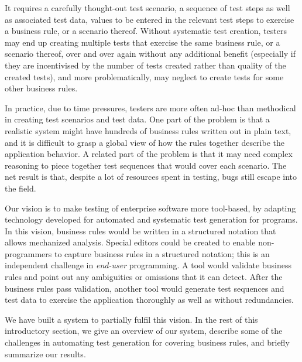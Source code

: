 
It requires a carefully thought-out test scenario, \ie a sequence of test steps
as well as associated test data, \ie values to be entered in the relevant test
steps to exercise a business rule, or a scenario thereof.  Without systematic
test creation, testers may end up creating multiple tests that exercise the same
business rule, or a scenario thereof, over and over again without any additional
benefit (especially if they are incentivised by the number of tests created
rather than quality of the created tests), and more problematically, may neglect
to create tests for some other business rules.

In practice, due to time pressures, testers are more often ad-hoc than
methodical in creating test scenarios and test data.  One part of the problem is
that a realistic system might have hundreds of business rules written out in
plain text, and it is difficult to grasp a global view of how the rules together
describe the application behavior.  A related part of the problem is that it may
need complex reasoning to piece together test sequences that would cover each
scenario.  The net result is that, despite a lot of resources spent in testing,
bugs still escape into the field.


Our vision is to make testing of enterprise software more tool-based, by
adapting technology developed for automated and systematic test generation for
programs. In this vision, business rules would be written in a structured
notation that allows mechanized analysis.  Special editors could be created
to enable non-programm\-ers to capture business rules in a structured notation;
this is an independent challenge in \textit{end-user} programming.  A tool would
validate business rules and point out any ambiguities or omissions that it can
detect.  After the business rules pass validation, another tool would generate
test sequences and test data to exercise the application thoroughly as well as
without redundancies.

We have built a system to partially fulfil this vision.  In the rest of this
introductory section, we give an overview of our system, describe some of the
challenges in automating test generation for covering business rules, and
briefly summarize our results.

